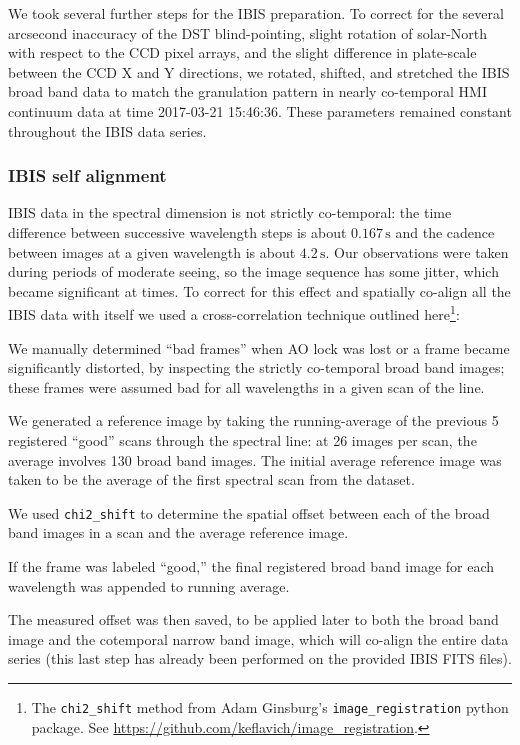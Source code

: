 \documentclass[twocolumn]{aastex62}
\newcommand{\unit}[1]{\ensuremath{\, \mathrm{#1}}}
\begin{document}
We took several further steps for the IBIS preparation.  
To correct for the several arcsecond inaccuracy of the DST blind-pointing, slight rotation of solar-North with respect to the CCD pixel arrays, and the slight difference in plate-scale between the CCD X and Y directions, we rotated, shifted, and stretched the IBIS broad band data to match the granulation pattern in nearly co-temporal HMI continuum data at time 2017-03-21 15:46:36.
These parameters remained constant throughout the IBIS data series.
\par


\subsubsection{IBIS self alignment}\label{sec:ibisselfalign}
IBIS data in the spectral dimension is not strictly co-temporal: the time difference between successive wavelength steps is about $0.167\unit{s}$ and the cadence between images at a given wavelength is about $4.2\unit{s}$.
Our observations were taken during periods of moderate seeing, so the image sequence has some jitter, which became significant at times.  
To correct for this effect and spatially co-align all the IBIS data with itself we used a cross-correlation technique outlined here\footnote{The \texttt{chi2\_shift} method from Adam Ginsburg's \texttt{image\_registration} python package.  See \url{https://github.com/keflavich/image_registration}.}: 
\begin{enumerate}
    {\item We manually determined ``bad frames'' when AO lock was lost or a frame became significantly distorted, by inspecting the strictly co-temporal broad band images; these frames were assumed bad for all wavelengths in a given scan of the line.}
    {\item We generated a reference image by taking the running-average of the previous 5 registered ``good'' scans through the spectral line: at 26 images per scan, the average involves 130 broad band images.
    The initial average reference image was taken to be the average of the first spectral scan from the dataset.}
    {\item We used \texttt{chi2\_shift} to determine the spatial offset between each of the broad band images in a scan and the average reference image.}
    {\item If the frame was labeled ``good,'' the final registered broad band image for each wavelength was appended to running average.}
    {\item The measured offset was then saved, to be applied later to both the broad band image and the cotemporal narrow band image, which will co-align the entire data series (this last step has already been performed on the provided IBIS FITS files).}
\end{enumerate}
\end{document}
